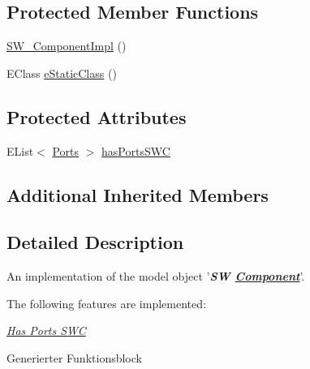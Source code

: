 \subsection*{Protected Member Functions}
\begin{DoxyCompactItemize}
\item 
\hyperlink{classshootingmachineemfmodel_1_1impl_1_1_s_w___component_impl_a93f7ce0be55ba0026d1ac4939fadaea3}{S\-W\-\_\-\-Component\-Impl} ()
\item 
E\-Class \hyperlink{classshootingmachineemfmodel_1_1impl_1_1_s_w___component_impl_a63156210e8dcb36161a20ac848ac3a99}{e\-Static\-Class} ()
\end{DoxyCompactItemize}
\subsection*{Protected Attributes}
\begin{DoxyCompactItemize}
\item 
E\-List$<$ \hyperlink{interfaceshootingmachineemfmodel_1_1_ports}{Ports} $>$ \hyperlink{classshootingmachineemfmodel_1_1impl_1_1_s_w___component_impl_ab662a79292869cbd21e936cb6b303251}{has\-Ports\-S\-W\-C}
\end{DoxyCompactItemize}
\subsection*{Additional Inherited Members}


\subsection{Detailed Description}
An implementation of the model object '{\itshape {\bfseries S\-W \hyperlink{interfaceshootingmachineemfmodel_1_1_component}{Component}}}'.

The following features are implemented\-: 
\begin{DoxyItemize}
\item \hyperlink{classshootingmachineemfmodel_1_1impl_1_1_s_w___component_impl_a506d6529374f47b28cb78ec920852c3b}{{\itshape Has Ports S\-W\-C}} 
\end{DoxyItemize}

Generierter Funktionsblock 

